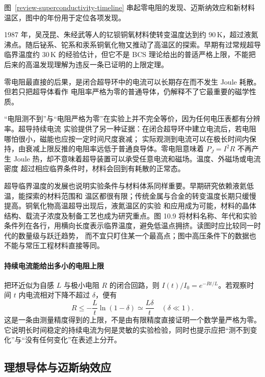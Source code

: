 图~\ref{review-superconductivity-timeline} 串起零电阻的发现、迈斯纳效应和新材料温区，图中的年份用于定位各项发现。

\superconductivityTimeline

\superconductivityChartFaithful

1987 年，吴茂昆、朱经武等人的钇钡铜氧材料使转变温度达到约 $90\,$K，超过液氮沸点。随后铋系、铊系和汞系铜氧化物又推动了高温区的探索。早期有过常规超导临界温度约 $30\,$K 的经验估计，但它不是 BCS 理论给出的普适严格上限，不能把后来的高温发现理解为违反一条已证明的上限定理。

零电阻最直接的后果，是闭合超导环中的电流可以长期存在而不发生 Joule 耗散。但若只把超导体看作
电阻率严格为零的普通导体，仍解释不了它最重要的磁学性质。

“电阻测不到”与“电阻严格为零”在实验上并不完全等价，因为任何电压表都有分辨率。超导持续电流
实验提供了另一种证据：在闭合超导环中建立电流后，若电阻哪怕很小，磁能也应按一定时间尺度衰减；
实际观测到电流可以在极长时间内保持，由衰减上限反推的电阻率远低于普通良导体。零电阻意味着
$P_J=I^2R$ 不再产生 Joule 热，却不意味着超导装置可以承受任意电流和磁场。温度、外磁场或电流密度
超过相应临界条件时，材料会回到有耗散的正常态。

超导临界温度的发展也说明实验条件与材料体系同样重要。早期研究依赖液氦低温，能探索的材料范围和
温区都很有限；传统金属与合金的转变温度长期只缓慢提高。铜氧化物高温超导出现后，液氮温区的实验
和应用成为可能，材料的晶体结构、载流子浓度及制备工艺也成为研究重点。图 10.9 将材料名称、年代和实验条件列在各行，用横向长度表示临界温度，避免低温点拥挤。读图时应比较同一时代的数量级与跃迁趋势，
而不宜只盯住某一个最高点；图中高压条件下的数据也不能与常压工程材料直接等同。


\paragraph{持续电流能给出多小的电阻上限}
把环近似为自感 $L$ 与极小电阻 $R$ 的闭合回路，则 $I(t)/I_0=e^{-Rt/L}$。若观察时间 $t$ 内电流相对下降不超过 $\delta$，便有
\[
 R\le-\frac Lt\ln(1-\delta)\simeq\frac{L\delta}{t}\quad(\delta\ll1).
\]
这是一条由测量精度得到的上限，不是由有限精度直接证明一个数学量严格为零。它说明长时间稳定的持续电流为何是灵敏的实验检验，同时也提示应把“测不到变化”与“没有任何变化”在表述上分开。

\subsection{理想导体与迈斯纳效应}

